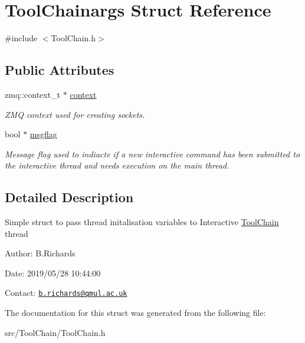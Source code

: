 \hypertarget{structToolChainargs}{\section{Tool\-Chainargs Struct Reference}
\label{structToolChainargs}
}


{\ttfamily \#include $<$Tool\-Chain.\-h$>$}

\subsection*{Public Attributes}
\begin{DoxyCompactItemize}
\item 
\hypertarget{structToolChainargs_a288a3015acf712919f128c216eecadad}{zmq\-::context\-\_\-t $\ast$ \hyperlink{structToolChainargs_a288a3015acf712919f128c216eecadad}{context}}\label{structToolChainargs_a288a3015acf712919f128c216eecadad}

\begin{DoxyCompactList}\small\item\em Z\-M\-Q context used for creating sockets. \end{DoxyCompactList}\item 
\hypertarget{structToolChainargs_a3551269b039d543b844a2d0d924ce96b}{bool $\ast$ \hyperlink{structToolChainargs_a3551269b039d543b844a2d0d924ce96b}{msgflag}}\label{structToolChainargs_a3551269b039d543b844a2d0d924ce96b}

\begin{DoxyCompactList}\small\item\em Message flag used to indiacte if a new interactive command has been submitted to the interactive thread and needs execution on the main thread. \end{DoxyCompactList}\end{DoxyCompactItemize}


\subsection{Detailed Description}
Simple struct to pass thread initalisation variables to Interactive \hyperlink{classToolChain}{Tool\-Chain} thread

\begin{DoxyParagraph}{Author\-:}
B.\-Richards 
\end{DoxyParagraph}
\begin{DoxyParagraph}{Date\-:}
2019/05/28 10\-:44\-:00 
\end{DoxyParagraph}
Contact\-: \href{mailto:b.richards@qmul.ac.uk}{\tt b.\-richards@qmul.\-ac.\-uk} 

The documentation for this struct was generated from the following file\-:\begin{DoxyCompactItemize}
\item 
src/\-Tool\-Chain/Tool\-Chain.\-h\end{DoxyCompactItemize}
